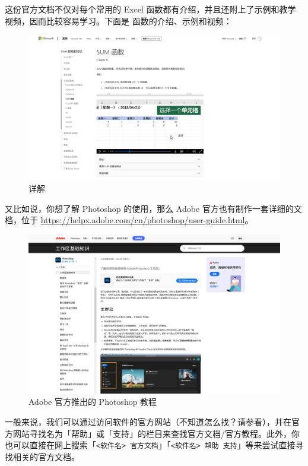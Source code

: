 这份官方文档不仅对每个常用的 Excel 函数都有介绍，并且还附上了示例和教学视频，因而比较容易学习。下面是  函数的介绍、示例和视频：

\begin{figure}[htb!]
  \centering
  \includegraphics[width=.85\textwidth]{assets/software/MS_document_for_Excel_2.png}
  \caption{ 详解}
  \label{fig:MS_document_for_Excel_1}
\end{figure}

又比如说，你想了解 Photoshop 的使用，那么 Adobe 官方也有制作一套详细的文档，位于 \url{https://helpx.adobe.com/cn/photoshop/user-guide.html}。

\begin{figure}[htb!]
  \centering
  \includegraphics[width=.8\textwidth]{assets/software/Adobe_document_for_PS.png}
  \caption{Adobe 官方推出的 Photoshop 教程}
  \label{fig:Adobe_document_for_PS}
\end{figure}

一般来说，我们可以通过访问软件的官方网站（不知道怎么找？请参看），并在官方网站寻找名为「帮助」或「支持」的栏目来查找官方文档/官方教程。此外，你也可以直接在网上搜索「\texttt{<软件名>\ 官方文档}」「\texttt{<软件名>\ 帮助\ 支持}」等来尝试直接寻找相关的官方文档。

